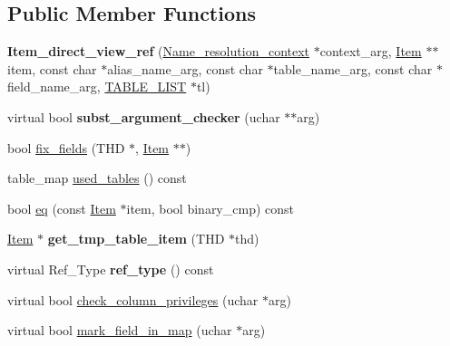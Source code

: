 \subsection*{Public Member Functions}
\begin{DoxyCompactItemize}
\item 
\mbox{\label{classItem__direct__view__ref_a11f7a234024cdcefe82598162283e1e1}} 
{\bfseries Item\+\_\+direct\+\_\+view\+\_\+ref} (\mbox{\hyperlink{structName__resolution__context}{Name\+\_\+resolution\+\_\+context}} $\ast$context\+\_\+arg, \mbox{\hyperlink{classItem}{Item}} $\ast$$\ast$item, const char $\ast$alias\+\_\+name\+\_\+arg, const char $\ast$table\+\_\+name\+\_\+arg, const char $\ast$field\+\_\+name\+\_\+arg, \mbox{\hyperlink{structTABLE__LIST}{T\+A\+B\+L\+E\+\_\+\+L\+I\+ST}} $\ast$tl)
\item 
\mbox{\label{classItem__direct__view__ref_ae9d07bcb61242c66495fdc2efa4dee9f}} 
virtual bool {\bfseries subst\+\_\+argument\+\_\+checker} (uchar $\ast$$\ast$arg)
\item 
bool \mbox{\hyperlink{classItem__direct__view__ref_acb21497e89521376904d0cfa9a8b9340}{fix\+\_\+fields}} (T\+HD $\ast$, \mbox{\hyperlink{classItem}{Item}} $\ast$$\ast$)
\item 
table\+\_\+map \mbox{\hyperlink{classItem__direct__view__ref_a53a4a787845b0c131234d3d9fb56d768}{used\+\_\+tables}} () const
\item 
bool \mbox{\hyperlink{classItem__direct__view__ref_ae9d8bc691bf2687ea154e83f8943bdf7}{eq}} (const \mbox{\hyperlink{classItem}{Item}} $\ast$item, bool binary\+\_\+cmp) const
\item 
\mbox{\label{classItem__direct__view__ref_a99b51f031b188df5f74a2ebfa995c2ee}} 
\mbox{\hyperlink{classItem}{Item}} $\ast$ {\bfseries get\+\_\+tmp\+\_\+table\+\_\+item} (T\+HD $\ast$thd)
\item 
\mbox{\label{classItem__direct__view__ref_a664792201971437d50b42eec2ebe9337}} 
virtual Ref\+\_\+\+Type {\bfseries ref\+\_\+type} () const
\item 
virtual bool \mbox{\hyperlink{classItem__direct__view__ref_af222b3c64ab25fe5d914154f0eb73039}{check\+\_\+column\+\_\+privileges}} (uchar $\ast$arg)
\item 
virtual bool \mbox{\hyperlink{classItem__direct__view__ref_a82d411e16d677c1a1eead5c386f6bdd0}{mark\+\_\+field\+\_\+in\+\_\+map}} (uchar $\ast$arg)
$$
\end{DoxyCompactItemize}
